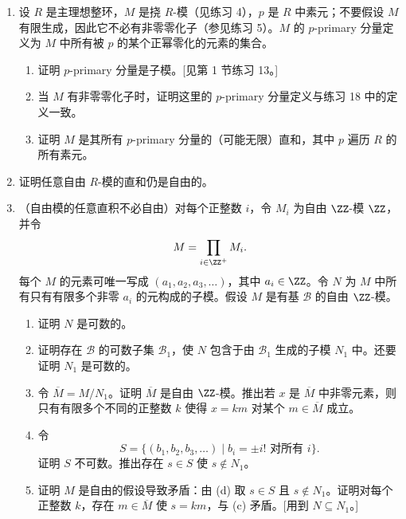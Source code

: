 \begin{enumerate}[label=\arabic*.]
\begin{enumerate}[label=(\roman*)]
		\[
		N_{i_1}\cap(N_{i_2}+\cdots+N_{i_k})=0;
		\]
		\item 若 $\{i_1,i_2,\ldots,i_k\}$ 是 $I$ 的任意有限子集，则
		\[
		N_{i_1}+\cdots+N_{i_k}=N_{i_1}\oplus\cdots\oplus N_{i_k};
		\]
		\item 对由 $N_i$ 生成的子模中的每个元素 $x$，存在唯一的一族元素 $a_i\in N_i$（$i\in I$），使得除有限多个 $a_i$ 外均为零，且 $x$ 是这些 $a_i$ 的有限和。
	\end{enumerate}
	\item 设 $R$ 是主理想整环，$M$ 是挠 $R$-模（见练习 4），$p$ 是 $R$ 中素元；不要假设 $M$ 有限生成，因此它不必有非零零化子（参见练习 5）。$M$ 的 $p$-primary 分量定义为 $M$ 中所有被 $p$ 的某个正幂零化的元素的集合。
	\begin{enumerate}[label=(\alph*)]
		\item 证明 $p$-primary 分量是子模。[见第 1 节练习 13。]
		\item 当 $M$ 有非零零化子时，证明这里的 $p$-primary 分量定义与练习 18 中的定义一致。
		\item 证明 $M$ 是其所有 $p$-primary 分量的（可能无限）直和，其中 $p$ 遍历 $R$ 的所有素元。
	\end{enumerate}
	\item 证明任意自由 $R$-模的直和仍是自由的。
	\item （自由模的任意直积不必自由）对每个正整数 $i$，令 $M_i$ 为自由 $\ZZ$-模 $\ZZ$，并令
	\[
	M=\prod_{i\in\ZZ^+}M_i.
	\]
	每个 $M$ 的元素可唯一写成 $(a_1,a_2,a_3,\ldots)$，其中 $a_i\in\ZZ$。令 $N$ 为 $M$ 中所有只有有限多个非零 $a_i$ 的元构成的子模。假设 $M$ 是有基 $\mathcal B$ 的自由 $\ZZ$-模。
	\begin{enumerate}[label=(\alph*)]
		\item 证明 $N$ 是可数的。
		\item 证明存在 $\mathcal B$ 的可数子集 $\mathcal B_1$，使 $N$ 包含于由 $\mathcal B_1$ 生成的子模 $N_1$ 中。还要证明 $N_1$ 是可数的。
		\item 令 $\overline M=M/N_1$。证明 $\overline M$ 是自由 $\ZZ$-模。推出若 $x$ 是 $\overline M$ 中非零元素，则只有有限多个不同的正整数 $k$ 使得 $x=km$ 对某个 $m\in\overline M$ 成立。
		\item 令
		\[
		S=\{(b_1,b_2,b_3,\ldots)\mid b_i=\pm i!\text{ 对所有 }i\}.
		\]
		证明 $S$ 不可数。推出存在 $s\in S$ 使 $s\notin N_1$。
		\item 证明 $M$ 是自由的假设导致矛盾：由 (d) 取 $s\in S$ 且 $s\notin N_1$。证明对每个正整数 $k$，存在 $m\in\overline M$ 使 $s=km$，与 (c) 矛盾。[用到 $N\subseteq N_1$。]
	\end{enumerate}

\end{enumerate}
